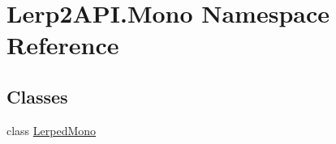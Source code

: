 \hypertarget{namespace_lerp2_a_p_i_1_1_mono}{}\section{Lerp2\+A\+P\+I.\+Mono Namespace Reference}
\label{namespace_lerp2_a_p_i_1_1_mono}
\subsection*{Classes}
\begin{DoxyCompactItemize}
\item 
class \hyperlink{class_lerp2_a_p_i_1_1_mono_1_1_lerped_mono}{Lerped\+Mono}
\end{DoxyCompactItemize}
